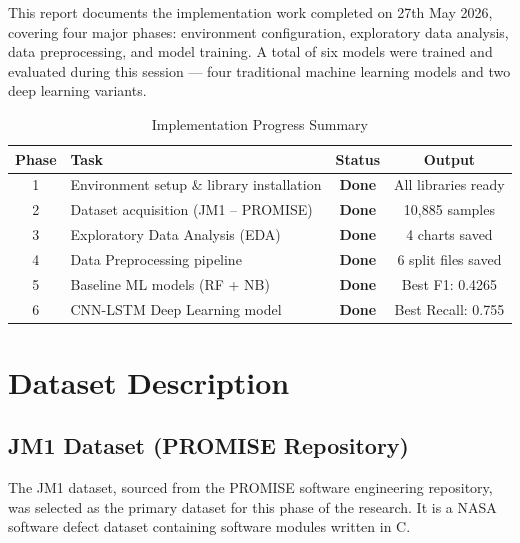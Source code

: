 \documentclass[12pt,a4paper]{article}
\begin{document}
This report documents the implementation work completed on 27th May 2026,
covering four major phases: environment configuration, exploratory data
analysis, data preprocessing, and model training. A total of six models
were trained and evaluated during this session — four traditional machine
learning models and two deep learning variants.

\begin{table}[H]
  \centering
  \caption{Implementation Progress Summary}
  \begin{tabular}{clcc}
    \toprule
    \textbf{Phase} & \textbf{Task} & \textbf{Status} & \textbf{Output} \\
    \midrule
    1 & Environment setup \& library installation & \textcolor{successgreen}{\textbf{Done}} & All libraries ready \\
    2 & Dataset acquisition (JM1 -- PROMISE)      & \textcolor{successgreen}{\textbf{Done}} & 10,885 samples \\
    3 & Exploratory Data Analysis (EDA)           & \textcolor{successgreen}{\textbf{Done}} & 4 charts saved \\
    4 & Data Preprocessing pipeline               & \textcolor{successgreen}{\textbf{Done}} & 6 split files saved \\
    5 & Baseline ML models (RF + NB)              & \textcolor{successgreen}{\textbf{Done}} & Best F1: 0.4265 \\
    6 & CNN-LSTM Deep Learning model              & \textcolor{successgreen}{\textbf{Done}} & Best Recall: 0.755 \\
    \bottomrule
  \end{tabular}
\end{table}

\section{Dataset Description}

\subsection{JM1 Dataset (PROMISE Repository)}

The JM1 dataset, sourced from the PROMISE software engineering repository,
was selected as the primary dataset for this phase of the research.
It is a NASA software defect dataset containing software modules written in C.
\end{document}
